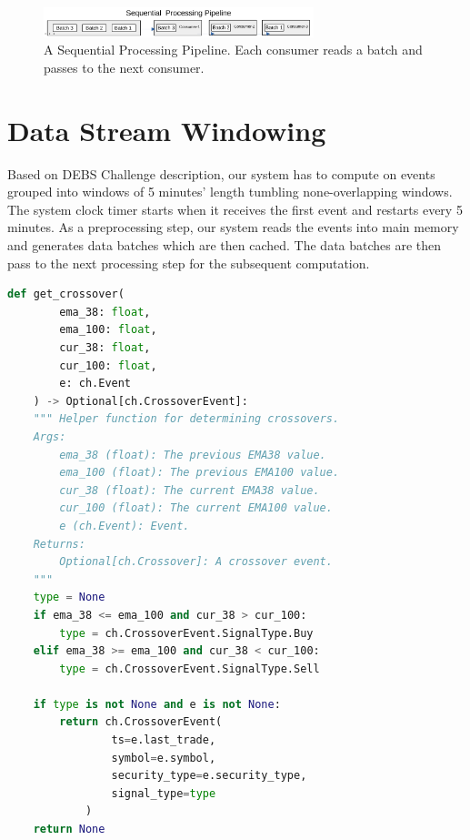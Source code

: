 \begin{figure}[!h]
    \begin{center}
        \includegraphics[width=0.7\textwidth]{./images/Stream-Batch-Distributions_op2}
        \caption{A Sequential Processing Pipeline. Each consumer reads a batch and passes to the next consumer.}
        \label{fig:Sequential-batch-distributions}
    \end{center}
\end{figure}



\section{Data Stream Windowing}\label{sec:windows}
Based on DEBS Challenge \cite{debs2022challenge} description, our system has to compute on events grouped into windows of 5 minutes’ length tumbling
none-overlapping windows. The system clock timer starts when it receives the first event and restarts every 5 minutes. As a preprocessing step, our system reads the events 
into main memory and generates data batches which are then cached. The data batches are then pass to the next processing step for the subsequent computation.   




\begin{minipage}{0.9\linewidth}
    \begin{lstlisting}[caption={The computation for Query 2 - Breakout Patterns of EMA38 and EMA100}, label={lst:query2},language=Python]
    def get_crossover(
        ema_38: float,
        ema_100: float,
        cur_38: float,
        cur_100: float,
        e: ch.Event
    ) -> Optional[ch.CrossoverEvent]:
    """ Helper function for determining crossovers.
    Args:
        ema_38 (float): The previous EMA38 value.
        ema_100 (float): The previous EMA100 value.
        cur_38 (float): The current EMA38 value.
        cur_100 (float): The current EMA100 value.
        e (ch.Event): Event.
    Returns:
        Optional[ch.Crossover]: A crossover event.
    """
    type = None
    if ema_38 <= ema_100 and cur_38 > cur_100:
        type = ch.CrossoverEvent.SignalType.Buy
    elif ema_38 >= ema_100 and cur_38 < cur_100:
        type = ch.CrossoverEvent.SignalType.Sell
    
    if type is not None and e is not None:
        return ch.CrossoverEvent(
                ts=e.last_trade,
                symbol=e.symbol,
                security_type=e.security_type,
                signal_type=type
            )
    return None
    \end{lstlisting}
    \end{minipage}
    
